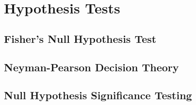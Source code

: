 \section{Hypothesis Tests}


\subsection{Fisher's Null Hypothesis Test}


\subsection{Neyman-Pearson Decision Theory}


\subsection{Null Hypothesis Significance Testing}